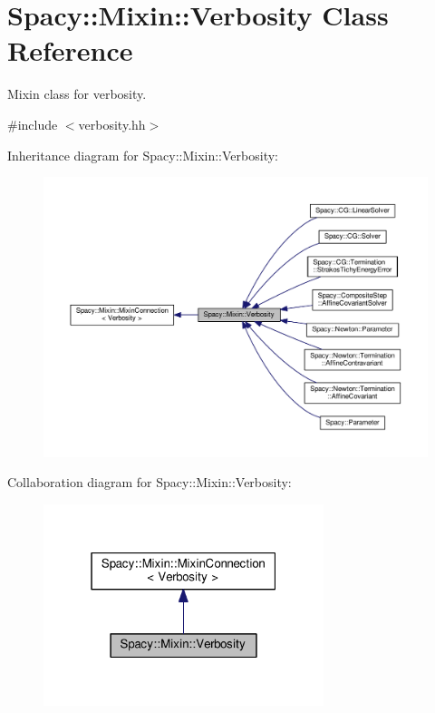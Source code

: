 \hypertarget{classSpacy_1_1Mixin_1_1Verbosity}{}\section{Spacy\+:\+:Mixin\+:\+:Verbosity Class Reference}
\label{classSpacy_1_1Mixin_1_1Verbosity}


Mixin class for verbosity.  




{\ttfamily \#include $<$verbosity.\+hh$>$}



Inheritance diagram for Spacy\+:\+:Mixin\+:\+:Verbosity\+:\nopagebreak
\begin{figure}[H]
\begin{center}
\leavevmode
\includegraphics[width=350pt]{classSpacy_1_1Mixin_1_1Verbosity__inherit__graph}
\end{center}
\end{figure}


Collaboration diagram for Spacy\+:\+:Mixin\+:\+:Verbosity\+:\nopagebreak
\begin{figure}[H]
\begin{center}
\leavevmode
\includegraphics[width=232pt]{classSpacy_1_1Mixin_1_1Verbosity__coll__graph}
\end{center}
\end{figure}
